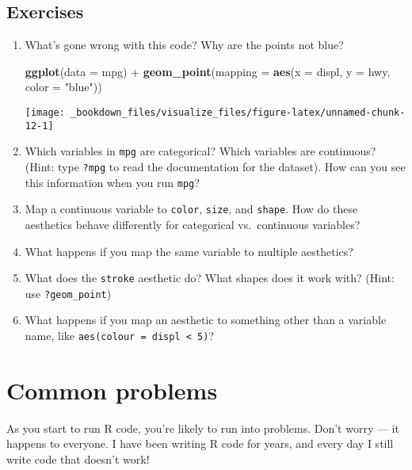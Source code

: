 \documentclass[]{book}
\newenvironment{Shaded}{\begin{snugshade}}{\end{snugshade}}
\newcommand{\KeywordTok}[1]{\textcolor[rgb]{0.13,0.29,0.53}{\textbf{{#1}}}}
\newcommand{\DataTypeTok}[1]{\textcolor[rgb]{0.13,0.29,0.53}{{#1}}}
\newcommand{\StringTok}[1]{\textcolor[rgb]{0.31,0.60,0.02}{{#1}}}
\newcommand{\NormalTok}[1]{{#1}}
\begin{document}
\subsection{Exercises}\label{exercises-1}

\begin{enumerate}
\def\labelenumi{\arabic{enumi}.}
\item
  What's gone wrong with this code? Why are the points not blue?

\begin{Shaded}
\begin{Highlighting}[]
\KeywordTok{ggplot}\NormalTok{(}\DataTypeTok{data =} \NormalTok{mpg) +}\StringTok{ }
\StringTok{  }\KeywordTok{geom_point}\NormalTok{(}\DataTypeTok{mapping =} \KeywordTok{aes}\NormalTok{(}\DataTypeTok{x =} \NormalTok{displ, }\DataTypeTok{y =} \NormalTok{hwy, }\DataTypeTok{color =} \StringTok{"blue"}\NormalTok{))}
\end{Highlighting}
\end{Shaded}

  \begin{center}\texttt{[image: \_bookdown\_files/visualize\_files/figure-latex/unnamed-chunk-12-1]} \end{center}
\item
  Which variables in \texttt{mpg} are categorical? Which variables are
  continuous? (Hint: type \texttt{?mpg} to read the documentation for
  the dataset). How can you see this information when you run
  \texttt{mpg}?
\item
  Map a continuous variable to \texttt{color}, \texttt{size}, and
  \texttt{shape}. How do these aesthetics behave differently for
  categorical vs.~continuous variables?
\item
  What happens if you map the same variable to multiple aesthetics?
\item
  What does the \texttt{stroke} aesthetic do? What shapes does it work
  with? (Hint: use \texttt{?geom\_point})
\item
  What happens if you map an aesthetic to something other than a
  variable name, like \texttt{aes(colour\ =\ displ\ \textless{}\ 5)}?
\end{enumerate}

\section{Common problems}\label{common-problems}

As you start to run R code, you're likely to run into problems. Don't
worry --- it happens to everyone. I have been writing R code for years,
and every day I still write code that doesn't work!
\end{document}
